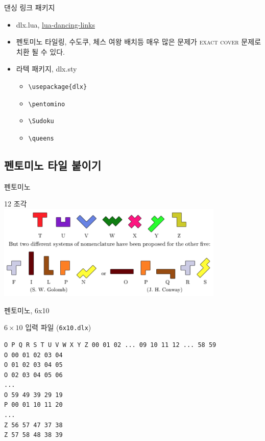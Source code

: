 \documentclass[xcolor=svgnames]{beamer}
\begin{document}
%
\begin{frame}[fragile]{댄싱 링크 패키지}
  \begin{itemize}
    \setlength\itemsep{1em}
  \item \alert{dlx.lua,} \href{https://github.com/sjnam/lua-dancing-links}
    {lua-dancing-links}
  \item 펜토미노 타일링, 수도쿠, 체스 여왕 배치등 매우 많은 문제가
    \textsc{exact cover} 문제로 치환 될 수 있다.
  \item 라텍 패키지, \alert{dlx.sty}
    \begin{itemize}
    \item \verb|\usepackage{dlx}|
    \item \verb|\pentomino|
    \item \verb|\Sudoku|
    \item \verb|\queens|
    \end{itemize}
  \end{itemize}
\end{frame}

%
\subsection{펜토미노 타일 붙이기}

%
\begin{frame}{펜토미노}
  \begin{center}
    {\Large 12 조각} \\
    \bigskip
  \includegraphics[height=45mm]{imgs/pentominoes.png}
  \end{center}
\end{frame}

%
\begin{frame}[fragile]{펜토미노, 6x10}
  \begin{center}
    \Large $6\times10$ 입력 파일 ({\normalsize \texttt{6x10.dlx}})
  \end{center}
  
\hskip-7mm\begin{minipage}{\textwidth}
\small
\begin{verbatim}
O P Q R S T U V W X Y Z 00 01 02 ... 09 10 11 12 ... 58 59
O 00 01 02 03 04
O 01 02 03 04 05
O 02 03 04 05 06
...
O 59 49 39 29 19
P 00 01 10 11 20
...
Z 56 57 47 37 38
Z 57 58 48 38 39
\end{verbatim}
\end{minipage}
\end{frame}
\end{document}
